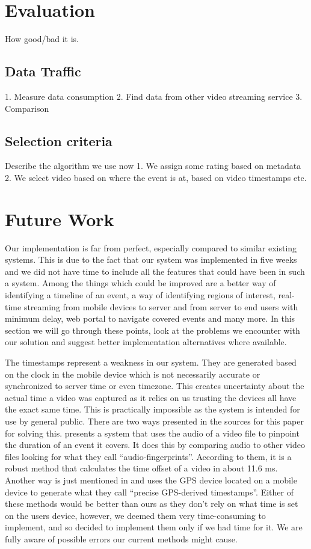 \documentclass[conference]{IEEEtran}
\begin{document}
\section{Evaluation}
How good/bad it is.

\subsection{Data Traffic} 

1. Measure data consumption
2. Find data from other video streaming service
3. Comparison

\subsection{Selection criteria}

Describe the algorithm we use now
1. We assign some rating based on metadata
2. We select video based on where the event is at, based on video timestamps
etc.

\section{Future Work}

Our implementation is far from perfect, especially compared to similar existing systems.
This is due to the fact that our system was implemented in five weeks and 
we did not have time to include all the features that could have been in such a system.
Among the things which could be improved are a better way of identifying a timeline of an event,
a way of identifying regions of interest, real-time streaming from mobile devices to server 
and from server to end users with minimum delay, web portal to navigate covered events and many more.
In this section we will go through these points, look at the problems we encounter with our solution 
and suggest better implementation alternatives where available.

The timestamps represent a weakness in our system.
They are generated based on the clock in the mobile device which is not necessarily accurate or 
synchronized to server time or even timezone. 
This creates uncertainty about the actual time a video was captured as it relies on us trusting the devices all have the exact same time.
This is practically impossible as the system is intended for use by general public. 
There are two ways presented in the sources for this paper for solving this. 
\cite{shrestha_automatic_2010} presents a system that uses the audio of a video file to pinpoint the duration of an event it covers.
It does this by comparing audio to other video files looking for what they call “audio-fingerprints”. 
According to them, it is a robust method that calculates the time offset of a video in about 11.6 ms. 
Another way is just mentioned in \cite{ jain_focus:_2013} and uses the GPS device located on a mobile device
to generate what they call “precise GPS-derived timestamps”.
Either of these methods would be better than ours as they don’t rely on what time is set on the users device,
however, we deemed them very time-consuming to implement, and so decided to implement them only if we had time for it.
We are fully aware of possible errors our current methods might cause.
\end{document}
